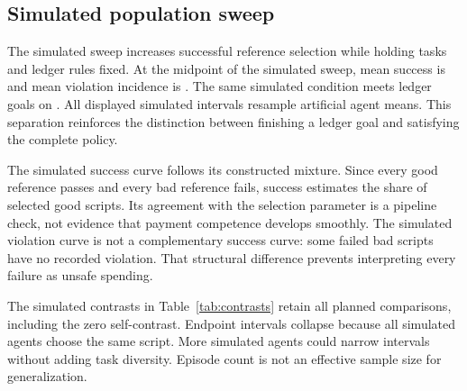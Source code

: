 \documentclass{article}
\begin{document}
\subsection{Simulated population sweep}
The simulated sweep increases successful reference selection while holding tasks and ledger rules fixed. At the midpoint of the simulated sweep, mean success is \MidSuccess{} and mean violation incidence is \MidViolation{}. The same simulated condition meets ledger goals on \MidGoal{}. All displayed simulated intervals resample artificial agent means. This separation reinforces the distinction between finishing a ledger goal and satisfying the complete policy.\par

\begin{table}[ht]\centering\small\caption{Simulated population sweep. Each row summarizes \AgentCount{} simulated selectors. Intervals bootstrap simulated agent means on the fixed task corpus.}\label{tab:simulation}\end{table}
The simulated success curve follows its constructed mixture. Since every good reference passes and every bad reference fails, success estimates the share of selected good scripts. Its agreement with the selection parameter is a pipeline check, not evidence that payment competence develops smoothly. The simulated violation curve is not a complementary success curve: some failed bad scripts have no recorded violation. That structural difference prevents interpreting every failure as unsafe spending.\par
The simulated contrasts in Table~\ref{tab:contrasts} retain all planned comparisons, including the zero self-contrast. Endpoint intervals collapse because all simulated agents choose the same script. More simulated agents could narrow intervals without adding task diversity. Episode count is not an effective sample size for generalization.\par
\begin{table}[ht]\centering\small\caption{Paired simulated success differences on a percentage-point scale. The same artificial agent seeds appear in both conditions. These comparisons describe the simulated mixture only.}\label{tab:contrasts}\end{table}
\end{document}
